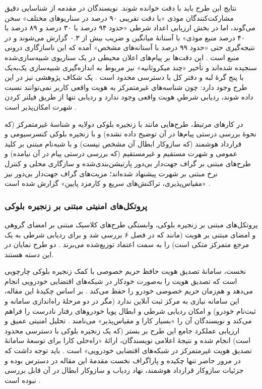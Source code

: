\documentclass[12pt,a4paper]{article}
\begin{document}
نتایج این طرح باید با دقت خوانده شوند. نویسندگان در مقدمه از شناسایی دقیق مشارکت‌کنندگان موذی «با دقت تقریبی ۹۰ درصد در سناریو‌های مختلف» سخن می‌گوند، اما در بخش ارزیابی اعداد شرطی «حدود ۹۴ درصد با ۳۰ درصد و ۸۹ درصد با ۴۰ درصد منبع موذی» با آستانهٔ میانگین و ضریب بیش از ۰.۳ گزارش می‌شوند و در نتیجه‌گیری حتی «حدود ۹۹ درصد با آستانه‌های مشخص» آمده که این ناسازگاری درونی منبع است \cite{feraudoDIVADIDbasedReputation2024}. این دقت‌ها بر پیام‌های اعلان محیطی در یک سناریوی شبیه‌سازی‌شده سنجیده شده‌اند و تأخیر «چند میکروثانیه» نیز مربوط به اندازه‌گیری شبیه‌سازی یک‌به‌یک با پنج گرهٔ لبه و دفتر کل با دسترسی محدود است \cite{feraudoDIVADIDbasedReputation2024}. یک شکاف پژوهشی نیز در این طرح وجود دارد: چون شناسه‌های غیرمتمرکز به هویت واقعی کاربر نمی‌توانند نسبت داده شوند، ردیابی شرطیِ هویت واقعی وجود ندارد و ردیابی تنها از طریق فیلتر کردن شهرت امکان‌پذیر است \cite{feraudoDIVADIDbasedReputation2024}.

در کار‌های مرتبط، طرح‌هایی مانند  با زنجیره بلوکی دولایه و شناسهٔ غیرمتمرکز (که نحوهٔ بررسی درستی پیام‌ها در آن توضیح داده نشده) و  با زنجیره بلوکی کنسرسیومی و قرارداد هوشمند (که سازوکار ابطال آن مشخص نیست) و  با شبه‌نام مبتنی بر کلید عمومی و شهرت مستقیم و غیرمستقیم (که بررسی درستی پیام در آن نیامده) و طرح‌های مبتنی بر گراف جهت‌دار بی‌دور پارتیشن‌بندی‌شده و سازگاری محلی و کنترل نرخ مبتنی بر شهرت پیشنهاد شده‌اند؛ مزیت‌های گراف جهت‌دار بی‌دور نیز «مقیاس‌پذیری، تراکنش‌های سریع و کارمزد پایین» گزارش شده است \cite{feraudoDIVADIDbasedReputation2024}.

\subsubsection{پروتکل‌های امنیتی مبتنی بر زنجیره بلوکی}

پروتکل‌های مبتنی بر زنجیره بلوکی، وابستگی طرح‌های کلاسیک مبتنی بر امضای گروهی و امضای مبتنی بر هویت (مانند  که در فصل ۶ بررسی شد و برای ردیابی شرطی به یک مرجع متمرکز متکی است) را به سمت اعتماد توزیع‌شده می‌برند \cite{linGSISSecurePrivacyPreserving2007}. دو طرح نمایان در این دسته هستند.

نخست، سامانهٔ تصدیق هویت حافظ حریم خصوصی با کمک زنجیره بلوکی  چارچوبی است که تصدیق هویت را به‌صورت خودکار در شبکه‌های اقتضایی خودرویی انجام می‌دهد و هم‌زمان حریم خصوصی خودرو را حفظ می‌کند \cite{fengBPASBlockchainAssistedPrivacyPreserving2020}. بر اساس چکیدهٔ این مقاله، این سامانه نیازی به مرکز ثبت آنلاین ندارد (مگر در دو مرحلهٔ راه‌اندازی سامانه و ثبت‌نام خودرو) و امکان ردیابی شرطی و ابطال پویا خودرو‌های رفتار نادرست را فراهم می‌کند و نویسندگان آن را «بسیار کارا و مقیاس‌پذیر» می‌نامند \cite{fengBPASBlockchainAssistedPrivacyPreserving2020}. تحلیل امنیتی عمیق و ارزیابی عملکرد جامع این طرح بر بستر  (که یک زنجیره بلوکی با دسترسی محدود است) انجام شده و نتیجهٔ اعلامی نویسندگان، ارائهٔ «راه‌حلی کارا برای توسعهٔ سامانهٔ تصدیق هویت غیرمتمرکز در شبکه‌های اقتضایی خودرویی» است \cite{fengBPASBlockchainAssistedPrivacyPreserving2020}. باید توجه داشت که در مرور حاضر تنها چکیده و پاراگراف نخست مقدمهٔ این مقاله در دسترس بوده و جزئیات سازوکار قرارداد هوشمند، نهاد ردیاب و سازوکار ابطال در آن قابل بررسی نبوده است \cite{fengBPASBlockchainAssistedPrivacyPreserving2020}.
\end{document}
